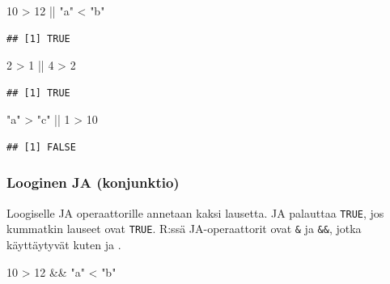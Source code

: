 \documentclass[
]{book}
\newenvironment{Shaded}{\begin{snugshade}}{\end{snugshade}}
\newcommand{\DecValTok}[1]{\textcolor[rgb]{0.00,0.00,0.81}{#1}}
\newcommand{\SpecialCharTok}[1]{\textcolor[rgb]{0.00,0.00,0.00}{#1}}
\newcommand{\StringTok}[1]{\textcolor[rgb]{0.31,0.60,0.02}{#1}}
\begin{document}
\begin{Shaded}
\begin{Highlighting}[]
\DecValTok{10} \SpecialCharTok{\textgreater{}} \DecValTok{12} \SpecialCharTok{||} \StringTok{"a"} \SpecialCharTok{\textless{}} \StringTok{"b"}
\end{Highlighting}
\end{Shaded}

\begin{verbatim}
## [1] TRUE
\end{verbatim}

\begin{Shaded}
\begin{Highlighting}[]
\DecValTok{2} \SpecialCharTok{\textgreater{}} \DecValTok{1} \SpecialCharTok{||} \DecValTok{4} \SpecialCharTok{\textgreater{}} \DecValTok{2}
\end{Highlighting}
\end{Shaded}

\begin{verbatim}
## [1] TRUE
\end{verbatim}

\begin{Shaded}
\begin{Highlighting}[]
\StringTok{"a"} \SpecialCharTok{\textgreater{}} \StringTok{"c"} \SpecialCharTok{||} \DecValTok{1} \SpecialCharTok{\textgreater{}} \DecValTok{10}
\end{Highlighting}
\end{Shaded}

\begin{verbatim}
## [1] FALSE
\end{verbatim}

\hypertarget{looginen-ja-konjunktio}{%
\subsubsection{Looginen JA (konjunktio)}\label{looginen-ja-konjunktio}}

Loogiselle JA operaattorille annetaan kaksi lausetta. JA palauttaa \texttt{TRUE}, jos kummatkin lauseet ovat \texttt{TRUE}. R:ssä JA-operaattorit ovat \texttt{\&} ja \texttt{\&\&}, jotka käyttäytyvät kuten \texttt{\textbar{}} ja \texttt{\textbar{}\textbar{}}.

\begin{Shaded}
\begin{Highlighting}[]
\DecValTok{10} \SpecialCharTok{\textgreater{}} \DecValTok{12} \SpecialCharTok{\&\&} \StringTok{"a"} \SpecialCharTok{\textless{}} \StringTok{"b"}
\end{Highlighting}
\end{Shaded}
\end{document}
